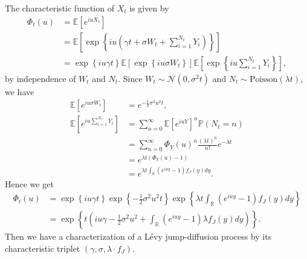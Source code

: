 The characteristic function of $X_t$ is given by
\begin{align*}
\Phi_t(u) &= \mathbb{E}\left[e^{iuX_t}\right]\\
&=\mathbb{E}\left[\exp\left\{iu\left(\gamma t + \sigma W_t+\sum_{i=1}^{N_t}Y_i\right)\right\}\right]\\
&= \exp\left\{iu\gamma t\right\}\mathbb{E}\left[\exp\left\{iu \sigma W_t\right\}\right]\mathbb{E}\left[\exp\left\{iu\sum_{i=1}^{N_t}Y_i\right\}\right],
\end{align*}
by independence of $W_t$ and $N_t$.
Since $W_t\sim\mathcal{N}(0,\sigma^2 t)$ and $N_t \sim \text{Poisson}(\lambda t)$, we have
\begin{align*}
\mathbb{E}\left[e^{iu\sigma W_t}\right]&=e^{-\frac{1}{2}\sigma^2 u^2 t}, \\
\mathbb{E}\left[e^{iu\sum_{i=1}^{N_t}Y_i}\right]&=\sum_{n=0}^\infty
\mathbb{E}\left[e^{iuY}\right]^n\mathbb{P}(N_t=n)\\
&=\sum_{n=0}^\infty \Phi_Y(u)^n\frac{(\lambda t)^n}{n!}e^{-\lambda t}\\
&=e^{\lambda t \left(\Phi_Y(u)-1\right)}\\
&=e^{\lambda t \int_\mathbb{R}\left(e^{iuy}-1\right)f_J(y)dy}.
\end{align*}
Hence we get
\begin{align}\label{eq:CF_Ljd}
\Phi_t(u) &= \exp\left\{iu\gamma t\right\}\exp\left\{-\frac{1}{2}\sigma^2 u^2 t\right\}\exp\left\{\lambda t \int_\mathbb{R}\left(e^{iuy}-1\right)f_J(y)dy\right\}\nonumber\\
&= \exp\left\{t\left(iu\gamma -\frac{1}{2}\sigma^2 u^2 + \int_\mathbb{R}\left(e^{iuy}-1\right)\lambda f_J(y)dy\right)\right\}.
\end{align}
Then we have a characterization of a L\'evy jump-diffusion process by its characteristic triplet $(\gamma,\sigma,\lambda\cdot f_J)$.

